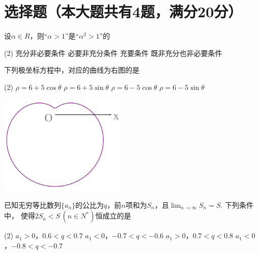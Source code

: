 \documentclass[12pt,space]{ctexart} %
\begin{document}
\section{选择题（本大题共有4题，满分20分）}
\begin{enumerate}[itemsep=-0.3em,topsep=0pt, resume]

  \item 设$\alpha\in R$，则“$\alpha>1$”是“$\alpha^2>1$”的
  \begin{tasks}(2)
    \task 充分非必要条件 \task 必要非充分条件 \task 充要条件 \task 既非充分也非必要条件
  \end{tasks}\vspace{1em}
  
  \begin{minipage}[h][5em][t]{.6\textwidth}
    \item 下列极坐标方程中，对应的曲线为右图的是
    \begin{tasks}(2)
      \task $\rho=6+5\cos\theta$ \task $\rho=6+5\sin\theta$ \task $\rho=6-5\cos\theta$ \task $\rho=6-5\sin\theta$
    \end{tasks}
  \end{minipage}
  \begin{minipage}[h][4em][b]{.3\textwidth}
    \centering\includegraphics[width=0.45\textwidth]{Image/sh-16.png}
  \end{minipage}

  \item 已知无穷等比数列$\{a_n\}$的公比为$q$，前$n$项和为$S_n$，且$\lim_{n\rightarrow\infty}S_n=S$. 下列条件中，
        使得$2S_n<S\,(n\in N^*)$恒成立的是
  \begin{tasks}(2)
    \task $a_1>0$，$0.6<q<0.7$ \task $a_1<0$，$-0.7<q<-0.6$ 
    \task $a_1>0$，$0.7<q<0.8$ \task $a_1<0$，$-0.8<q<-0.7$ 
  \end{tasks}

\end{enumerate}

\clearpage
\end{document}

